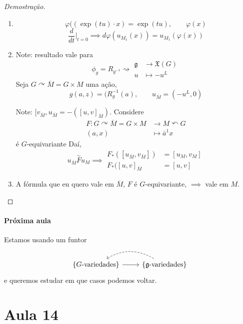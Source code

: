 \begin{proof}[Demostração]\leavevmode 
	\begin{enumerate}
	\item \[\varphi((\operatorname{exp}(tu) \cdot x)=\operatorname{exp}(tu),\qquad \varphi(x)\]
			\[\frac{d}{dt}\Big|_{t=0}\implies d\varphi (u_{M_1}(x))=u_{M_1}(\varphi(x))\]

		\item Note: resultado vale para \[\phi_g=R_{g ^{-1}}\rightsquigarrow \begin{aligned}
			\mathfrak{g} &\longrightarrow \mathfrak{X}(G) \\
			u &\longmapsto -u^L
		\end{aligned}\]
		Seja $G\curvearrowright \overline{M}=G\times M$ uma ação, \[g(a,z)=(R^{-1}_{g}(a), \qquad u_{\overline{M}}=(-u^L,0)\]

		Note: $[v_{\overline{M}},u_{\overline{M}}=-\left( [u,v]_{\overline{M}} \right) $. Considere
		\begin{align*}
			F: G\curvearrowright \overline{M}=G\times M &\longrightarrow M\curvearrowleft G  \\
			(a,x) &\longmapsto \bar{a}^1x
		\end{align*}
		é $G$-equivariante Daí,
		\[u_{\overline{M}} \overset{\sim}{F}u_M\implies \begin{aligned}
			F_*([u_{\overline{M}},v_{\overline{M}}])&=[u_{M},v_M]\\
			F_*([u,v]_{\overline{M}}&=[u,v]
		\end{aligned}\]
		
		\item A fórmula que eu quero vale em $ \overline{M}$, $F$ é $G$-equivariante, $\implies $ vale em $M$.
	\end{enumerate}
\end{proof}

\paragraph{Próxima aula} 
Estamos usando um funtor
\[\begin{tikzcd}
\{G\text{-variedades} \}\arrow[r]&\{\mathfrak{g} \text{-variedades} \} \arrow[l,bend right, dashed]	
\end{tikzcd}\]
e queremos estudar em que casos podemos voltar.

\section{Aula 14}

